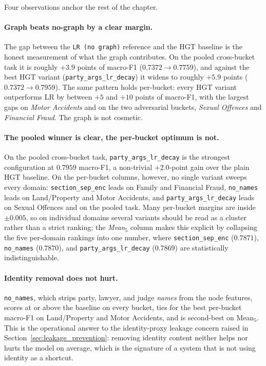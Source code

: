 Four observations anchor the rest of the chapter.

\paragraph{Graph beats no-graph by a clear margin.} The gap between
the \texttt{LR (no graph)} reference and the HGT baseline is the
honest measurement of what the graph contributes. On the pooled
cross-bucket task it is roughly $+3.9$ points of macro-F1
($0.7372 \to 0.7759$), and against the best HGT variant
(\texttt{party\_args\_lr\_decay}) it widens to roughly $+5.9$ points
($0.7372 \to 0.7959$). The same pattern holds per-bucket: every
HGT variant outperforms LR by between $+5$ and $+10$ points of
macro-F1, with the largest gaps on \emph{Motor Accidents} and on the
two adversarial buckets, \emph{Sexual Offences} and \emph{Financial
Fraud}. The graph is not cosmetic.

\paragraph{The pooled winner is clear, the per-bucket optimum is
not.} On the pooled cross-bucket task,
\texttt{party\_args\_lr\_decay} is the strongest configuration at
$0.7959$ macro-F1, a non-trivial $+2.0$-point gain over the plain
HGT baseline. On the per-bucket columns, however, no single variant
sweeps every domain: \texttt{section\_sep\_enc} leads on Family and
Financial Fraud, \texttt{no\_names} leads on Land/Property and Motor
Accidents, and \texttt{party\_args\_lr\_decay} leads on Sexual
Offences and on the pooled task. Many per-bucket margins are inside
$\pm 0.005$, so on individual domains several variants should be
read as a cluster rather than a strict ranking; the \emph{Mean$_5$}
column makes this explicit by collapsing the five per-domain
rankings into one number, where \texttt{section\_sep\_enc} ($0.7871$),
\texttt{no\_names} ($0.7870$), and \texttt{party\_args\_lr\_decay}
($0.7869$) are statistically indistinguishable.

\paragraph{Identity removal does not hurt.} \texttt{no\_names},
which strips party, lawyer, and judge \emph{names} from the node
features, scores at or above the baseline on every bucket, ties for
the best per-bucket macro-F1 on Land/Property and Motor Accidents,
and is second-best on Mean$_5$. This is the operational answer to
the identity-proxy leakage concern raised in
Section~\ref{sec:leakage_prevention}: removing identity content
neither helps nor hurts the model on average, which is the signature
of a system that is not using identity as a shortcut.

